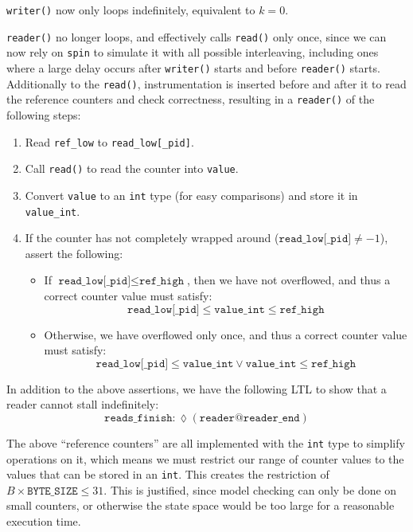 \documentclass[a4paper]{scrartcl}
\newcommand{\eventually}{\lozenge}
\begin{document}
\texttt{writer()} now only loops indefinitely, equivalent to \(k = 0\).

\texttt{reader()} no longer loops, and effectively calls \texttt{read()} only once, since we can now rely on \texttt{spin} to simulate it with all possible interleaving, including ones where a large delay occurs after \texttt{writer()} starts and before \texttt{reader()} starts. Additionally to the \texttt{read()}, instrumentation is inserted before and after it to read the reference counters and check correctness, resulting in a \texttt{reader()} of the following steps:
\begin{enumerate}
    \item Read \texttt{ref\_low} to \texttt{read\_low[\_pid]}.
    \item Call \texttt{read()} to read the counter into \texttt{value}.
    \item Convert \texttt{value} to an \texttt{int} type (for easy comparisons) and store it in \texttt{value\_int}.
    \item If the counter has not completely wrapped around (\(\texttt{read\_low[\_pid]} \neq -1\)), assert the following:
    \begin{itemize}
        \item If \(\texttt{read\_low[\_pid]} \le \texttt{ref\_high}\), then we have not overflowed, and thus a correct counter value must satisfy:
        \[\texttt{read\_low[\_pid]} \le \texttt{value\_int} \le \texttt{ref\_high}\]
        \item Otherwise, we have overflowed only once, and thus a correct counter value must satisfy:
        \[\texttt{read\_low[\_pid]} \le \texttt{value\_int} \lor \texttt{value\_int} \le \texttt{ref\_high}\]
    \end{itemize}
\end{enumerate}

In addition to the above assertions, we have the following LTL to show that a reader cannot stall indefinitely:
\[\texttt{reads\_finish}: \eventually(\texttt{reader@reader\_end})\]

The above ``reference counters'' are all implemented with the \texttt{int} type to simplify operations on it, which means we must restrict our range of counter values to the values that can be stored in an \texttt{int}. This creates the restriction of \(B \times \texttt{BYTE\_SIZE} \le 31\). This is justified, since model checking can only be done on small counters, or otherwise the state space would be too large for a reasonable execution time.
\end{document}

